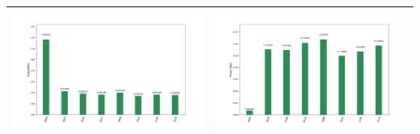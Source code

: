 \begin{landscape}
\begin{table}[ht]
\begin{tabular}{c c}
        \includegraphics[scale=0.32]{Grover_results/Grover_n=3,m=3.png} & \includegraphics[scale=0.32]{Grover_results/Grover_n=3,m=4.png} \\ \hline
    \end{tabular}
\end{table}
\end{landscape}

